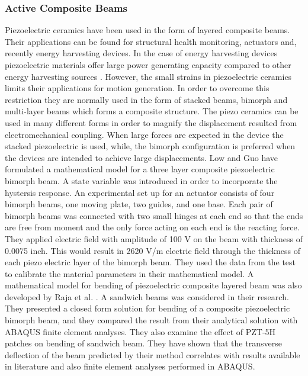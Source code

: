 \subsubsection{Active Composite Beams}
Piezoelectric ceramics have been used in the form of layered composite beams. 
Their applications can be found for structural health monitoring, actuators and, recently energy harvesting devices. 
In the case of energy harvesting devices piezoelectric materials offer large power generating capacity compared to other energy harvesting sources \cite{erturk2011piezoelectric}. 
However, the small strains in piezoelectric ceramics limits their applications for motion generation. 
In order to overcome this restriction they are normally used in the form of stacked beams, bimorph and multi-layer beams which forms a composite structure. 
The piezo ceramics can be used in many different forms in order to magnify the displacement resulted from electromechanical coupling. 
When large forces are expected in the device the stacked piezoelectric is used,
 while, the bimorph configuration is preferred when the devices are intended to achieve large displacements.
Low and Guo \cite{low1995modeling} have formulated a mathematical model for a three layer composite piezoelectric bimorph beam.
A state variable was introduced in order to incorporate the hystersis response. 
An experimental set up for an actuator consists of four bimorph beams, one moving plate, two guides, and one base.
Each pair of bimorph beams was connected with two small hinges at each end so that
 the ends are free from moment and the only force acting on each end
 is the reacting force. 
They applied electric field with amplitude of 100 V on the beam with thickness of 0.0075 inch.
This would result in 2620 V/m electric field through the thickness of each piezo electric layer of the bimorph beam. 
They used the data from the test to calibrate the material parameters in their mathematical model.
A mathematical model for bending of piezoelectric composite layered beam was also developed by Raja et al. \cite{raja2004bending}.
A sandwich beams was considered in their research. 
They presented a closed form solution for bending of a composite piezoelectric bimorph beam, and
 they compared the result from their analytical solution with ABAQUS finite element analyses.
They also examine the effect of PZT-5H patches on bending of sandwich beam.  
They have shown that the transverse deflection of the beam predicted by their method correlates with results available in literature and also finite element analyses performed in ABAQUS.

